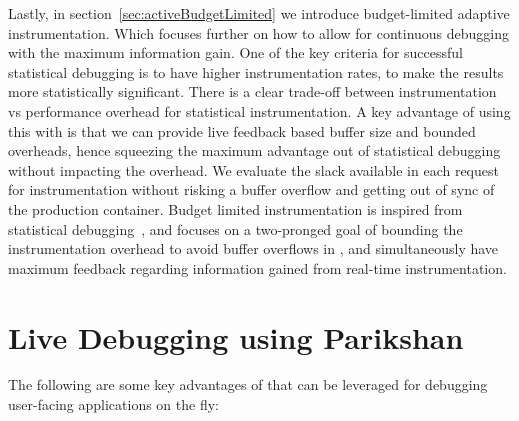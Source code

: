 Lastly, in section~\ref{sec:activeBudgetLimited} we introduce budget-limited adaptive instrumentation. Which focuses further on how to allow for continuous debugging with the maximum information gain.
One of the key criteria for successful statistical debugging is to have higher instrumentation rates, to make the results more statistically significant. 
There is a clear trade-off between instrumentation vs performance overhead for statistical instrumentation. 
A key advantage of using this with \parikshan is that we can provide live feedback based buffer size and bounded overheads, hence squeezing the maximum advantage out of statistical debugging without impacting the overhead. 
We evaluate the slack available in each request for instrumentation without risking a buffer overflow and getting out of sync of the production container.
Budget limited instrumentation is inspired from statistical debugging~\cite{statisticalDebugging}, and focuses on a two-pronged goal of bounding the instrumentation overhead to avoid buffer overflows in \parikshan, and simultaneously have maximum feedback regarding information gained from real-time instrumentation.

\section{Live Debugging using Parikshan}
\label{sec:guidedDiscussion}

The following are some key advantages of \parikshan that can be leveraged for debugging user-facing applications on the fly:

